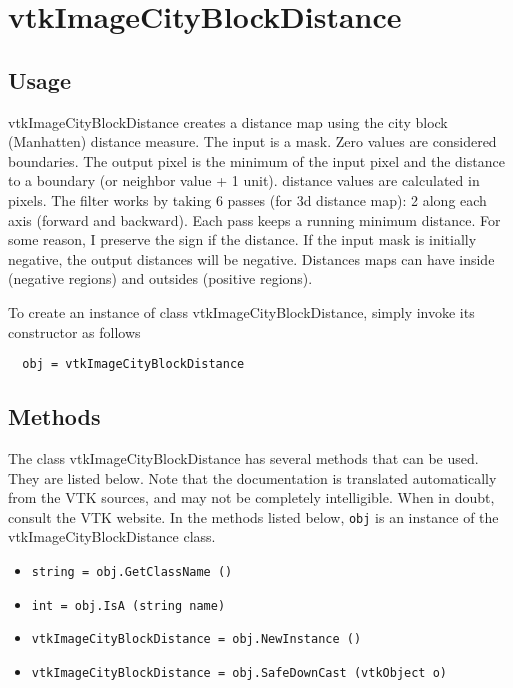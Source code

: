 \section{vtkImageCityBlockDistance}

\subsection{Usage}

 vtkImageCityBlockDistance creates a distance map using the city block
 (Manhatten) distance measure.  The input is a mask.  Zero values are
 considered boundaries.  The output pixel is the minimum of the input pixel
 and the distance to a boundary (or neighbor value + 1 unit).
 distance values are calculated in pixels.
 The filter works by taking 6 passes (for 3d distance map): 2 along each 
 axis (forward and backward). Each pass keeps a running minimum distance.
 For some reason, I preserve the sign if the distance.  If the input 
 mask is initially negative, the output distances will be negative.
 Distances maps can have inside (negative regions) 
 and outsides (positive regions).

To create an instance of class vtkImageCityBlockDistance, simply
invoke its constructor as follows
\begin{verbatim}
  obj = vtkImageCityBlockDistance
\end{verbatim}
\subsection{Methods}

The class vtkImageCityBlockDistance has several methods that can be used.
  They are listed below.
Note that the documentation is translated automatically from the VTK sources,
and may not be completely intelligible.  When in doubt, consult the VTK website.
In the methods listed below, \verb|obj| is an instance of the vtkImageCityBlockDistance class.
\begin{itemize}
\item  \verb|string = obj.GetClassName ()|

\item  \verb|int = obj.IsA (string name)|

\item  \verb|vtkImageCityBlockDistance = obj.NewInstance ()|

\item  \verb|vtkImageCityBlockDistance = obj.SafeDownCast (vtkObject o)|

\end{itemize}

